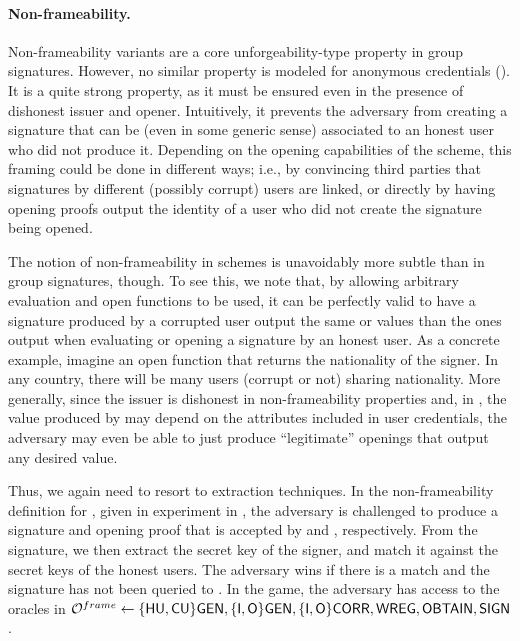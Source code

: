 \paragraph{Non-frameability.} %
Non-frameability variants are a core unforgeability-type property in group
signatures. However, no similar property is modeled for anonymous credentials
(). It is a quite
strong property, as it must be ensured even in the presence of dishonest issuer
and opener. Intuitively, it prevents the adversary from creating a signature
that can be (even in some generic sense) associated to an honest user who did
not produce it. Depending on the opening capabilities of the scheme,
this framing could be done in different ways; i.e., by convincing third parties
that signatures by different (possibly corrupt) users are linked, or directly
by having opening proofs output the identity of a user who did not create the
signature being opened.

The notion of non-frameability in \UAS schemes is unavoidably more subtle than
in group signatures, though. To see this, we note that, by allowing arbitrary
evaluation and open functions to be used, it can be perfectly valid to
have a signature produced by a corrupted user output the same \yeval or \yinsp
values than the ones output when evaluating or opening a signature by an honest
user. As a concrete example, imagine an open function that returns the
nationality of the signer. In any country, there will be many users (corrupt or
not) sharing nationality.
%
More generally, since the issuer is dishonest in non-frameability properties
and, in \UAS, the value produced by \Open may depend on the attributes
included in user credentials, the adversary may even be able to just produce
``legitimate'' openings that output any desired value.

Thus, we again need to resort to extraction techniques. In the non-frameability
definition for \UAS, given in experiment \ExpNonframe in
, the adversary is challenged to produce a signature
and opening proof that is accepted by \Verify and \Judge, respectively. From
the signature, we then extract the secret key of the signer, and match it
against the secret keys of the honest users. The adversary wins if there is a
match and the signature has not been queried to \SIGN. In the game, the
adversary has access to the oracles in $\mathcal{O}^{frame} \gets \lbrace\mathsf{HU},\mathsf{CU}\rbrace\mathsf{GEN},
\lbrace\mathsf{I},\mathsf{O}\rbrace\mathsf{GEN},\lbrace\mathsf{I},\mathsf{O}\rbrace\mathsf{CORR},\mathsf{WREG},\mathsf{OBTAIN},\mathsf{SIGN}$.

